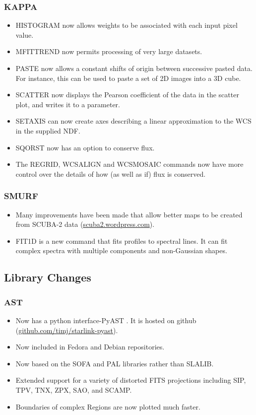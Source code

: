 \documentclass[11pt,twoside]{article}
\begin{document}
\subsubsection{KAPPA}
\begin{itemize}
\item HISTOGRAM now allows weights to be associated with each input pixel value.
\item MFITTREND now permits processing of very large datasets.
\item PASTE now allows a constant shifts of origin between successive pasted data. For instance, this can be used to paste a set of 2D images into a 3D cube.
\item SCATTER now displays the Pearson coefficient of the data in the scatter plot, and writes it to a parameter.
\item SETAXIS can now create axes describing a linear approximation to the WCS in the supplied NDF.
\item SQORST now has an option to conserve flux.
\item The REGRID, WCSALIGN and WCSMOSAIC commands now have more control over the details of how (as well as if) flux is conserved.
\end{itemize}

\subsubsection{SMURF}
\begin{itemize}
\item Many improvements have been made that allow better maps to be
created from SCUBA-2 data (\url{scuba2.wordpress.com}).
\item FIT1D is a new command that fits profiles to spectral lines.  It can fit complex spectra with multiple components and non-Gaussian shapes.
\end{itemize}


\subsection{Library Changes}

\subsubsection{AST}
\begin{itemize}
\item Now has a python interface-PyAST \citep{P011_adassxxi}. It is
hosted on github (\url{github.com/timj/starlink-pyast}).
\item Now included in Fedora and Debian repositories.
\item Now based on the SOFA and PAL libraries rather than SLALIB.
\item Extended support for a variety of distorted FITS projections including SIP, TPV, TNX, ZPX, SAO, and SCAMP.
\item Boundaries of complex Regions are now plotted much faster.
\end{itemize}
\end{document}
